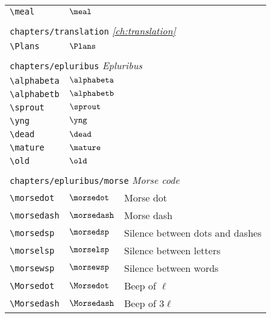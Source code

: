 \begin{longtable}{lll}
 {\color[rgb]{0.5,0.5,0.5}\texttt{\textbackslash meal}} & $\meal$ & \\ 
  &  & \\ 
 \multicolumn{3}{l}{{\color[rgb]{0.5,0.5,0.5}\texttt{chapters/translation}} \emph{\cref{ch:translation}}}\\ 
 \hline
{\color[rgb]{0.5,0.5,0.5}\texttt{\textbackslash Plans}} & $\Plans$ & \\ 
  &  & \\ 
 \multicolumn{3}{l}{{\color[rgb]{0.5,0.5,0.5}\texttt{chapters/epluribus}} \emph{Epluribus}}\\ 
 \hline
{\color[rgb]{0.5,0.5,0.5}\texttt{\textbackslash alphabeta}} & $\alphabeta$ & \\ 
 {\color[rgb]{0.5,0.5,0.5}\texttt{\textbackslash alphabetb}} & $\alphabetb$ & \\ 
 {\color[rgb]{0.5,0.5,0.5}\texttt{\textbackslash sprout}} & $\sprout$ & \\ 
 {\color[rgb]{0.5,0.5,0.5}\texttt{\textbackslash yng}} & $\yng$ & \\ 
 {\color[rgb]{0.5,0.5,0.5}\texttt{\textbackslash dead}} & $\dead$ & \\ 
 {\color[rgb]{0.5,0.5,0.5}\texttt{\textbackslash mature}} & $\mature$ & \\ 
 {\color[rgb]{0.5,0.5,0.5}\texttt{\textbackslash old}} & $\old$ & \\ 
  &  & \\ 
 \multicolumn{3}{l}{{\color[rgb]{0.5,0.5,0.5}\texttt{chapters/epluribus/morse}} \emph{Morse code}}\\ 
 \hline
{\color[rgb]{0.5,0.5,0.5}\texttt{\textbackslash morsedot}} & $\morsedot$ &  Morse dot\\ 
 {\color[rgb]{0.5,0.5,0.5}\texttt{\textbackslash morsedash}} & $\morsedash$ &  Morse dash\\ 
 {\color[rgb]{0.5,0.5,0.5}\texttt{\textbackslash morsedsp}} & $\morsedsp$ &  Silence between dots and dashes\\ 
 {\color[rgb]{0.5,0.5,0.5}\texttt{\textbackslash morselsp}} & $\morselsp$ &  Silence between letters\\ 
 {\color[rgb]{0.5,0.5,0.5}\texttt{\textbackslash morsewsp}} & $\morsewsp$ &  Silence between words\\ 
 {\color[rgb]{0.5,0.5,0.5}\texttt{\textbackslash Morsedot}} & $\Morsedot$ &  Beep of $\ell$\\ 
 {\color[rgb]{0.5,0.5,0.5}\texttt{\textbackslash Morsedash}} & $\Morsedash$ &  Beep of $3\ell$\\ 

\end{longtable}
